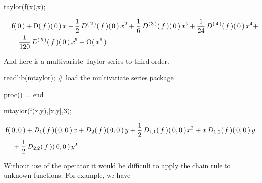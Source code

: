 \documentclass[11pt,dvips]{mtn}
\begin{document}
\begin{mapleinput}
taylor(f(x),x);
\end{mapleinput}
\begin{maplettyout}
\end{maplettyout}
\begin{maplelatex}
\begin{eqnarray*}
\lefteqn{{\rm f}(\,0\,) + {\rm D}(\,{f}\,)(\,0\,)\,{x} + 
{\displaystyle \frac {1}{2}}\,{D}^{(\,2\,)}(\,{f}\,)(\,0\,)\,{x}
^{2} + {\displaystyle \frac {1}{6}}\,{D}^{(\,3\,)}(\,{f}\,)(\,0\,
)\,{x}^{3} + {\displaystyle \frac {1}{24}}\,{D}^{(\,4\,)}(\,{f}\,
)(\,0\,)\,{x}^{4} + } \\
 & & {\displaystyle \frac {1}{120}}\,{D}^{(\,5\,)}(\,{f}\,)(\,0\,
)\,{x}^{5} + {\rm O}(\,{x}^{6}\,)\mbox{\hspace{200pt}}
\end{eqnarray*}
\end{maplelatex}
And here is a multivariate Taylor series to third order.

\begin{mapleinput}
readlib(mtaylor); # load the multivariate series package
\end{mapleinput}
\begin{maplelatex}
\end{maplelatex}
\begin{maplettyout}
proc() ... end

\end{maplettyout}
\begin{mapleinput}
mtaylor(f(x,y),[x,y],3);
\end{mapleinput}
\begin{maplettyout}
\end{maplettyout}
\begin{maplelatex}
\begin{eqnarray*}
\lefteqn{{\rm f}(\,0, 0\,) + {{D}_{1}}(\,{f}\,)(\,0, 0\,)\,{x} + 
{{D}_{2}}(\,{f}\,)(\,0, 0\,)\,{y} + {\displaystyle \frac {1}{2}}
\,{{D}_{1, 1}}(\,{f}\,)(\,0, 0\,)\,{x}^{2} + {x}\,{{D}_{1, 2}}(\,
{f}\,)(\,0, 0\,)\,{y}} \\
 & & \mbox{} + {\displaystyle \frac {1}{2}}\,{{D}_{2, 2}}(\,{f}\,
)(\,0, 0\,)\,{y}^{2}\mbox{\hspace{250pt}}
\end{eqnarray*}
\end{maplelatex}

\newpage
Without use of the  operator it would be difficult to apply
the chain rule to unknown functions.  For example, we have
\end{document}
